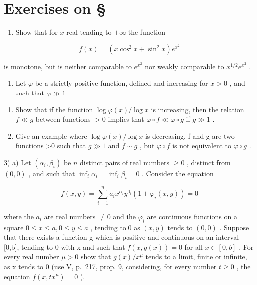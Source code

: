 \section*{Exercises on \S{}}
{}

\begin{enumerate}
\def\labelenumi{\arabic{enumi})}
\tightlist
\item
  Show that for \(x\) real tending to \(+\infty\) the function
\end{enumerate}

\[
f (x) = \left(x \cos^ {2} x + \sin^ {2} x\right) e ^ {x ^ {2}}
\]

is monotone, but is neither comparable to \(e^{x^2}\) nor weakly comparable to \(x^{1/2}e^{x^2}\) .

\begin{enumerate}
\def\labelenumi{\arabic{enumi})}
\setcounter{enumi}{1}
\tightlist
\item
  Let \(\varphi\) be a strictly positive function, defined and increasing for \(x > 0\) , and such that \(\varphi \gg 1\) .
\end{enumerate}

\begin{enumerate}
\def\labelenumi{\alph{enumi})}
\item
  Show that if the function \(\log \varphi(x) / \log x\) is increasing, then the relation \(f \ll g\) between functions \(>0\) implies that \(\varphi \circ f \ll \varphi \circ g\) if \(g \gg 1\) .
\item
  Give an example where \(\log \varphi(x)/\log x\) is decreasing, f and g are two functions \textgreater0 such that \(g \gg 1\) and \(f \sim g\) , but \(\varphi \circ f\) is not equivalent to \(\varphi \circ g\) .
\end{enumerate}

3) a) Let \((\alpha_{i},\beta_{i})\) be \(n\) distinct pairs of real numbers \(\geqslant 0\) , distinct from \((0,0)\) , and such that \(\inf_{i}\alpha_{i} = \inf_{i}\beta_{i} = 0\) . Consider the equation

\[
f (x, y) = \sum_ {i = 1} ^ {n} a _ {i} x ^ {\alpha_ {i}} y ^ {\beta_ {i}} \left(1 + \varphi_ {i} (x, y)\right) = 0
\]

where the \(a_{i}\) are real numbers \(\neq0\) and the \(\varphi_{i}\) are continuous functions on a square \(0\leqslant x\leqslant a,0\leqslant y\leqslant a\) , tending to 0 as \((x,y)\) tends to \((0,0)\) . Suppose that there exists a function g which is positive and continuous on an interval {[}0,b{]}, tending to 0 with x and such that \(f(x,g(x))=0\) for all \(x\in[0,b]\) . For every real number \(\mu>0\) show that \(g(x)/x^{\mu}\) tends to a limit, finite or infinite, as x tends to 0 (use V, p.~217, prop. 9, considering, for every number \(t\geqslant0\) , the equation \(f(x,tx^{\mu})=0\) ).

